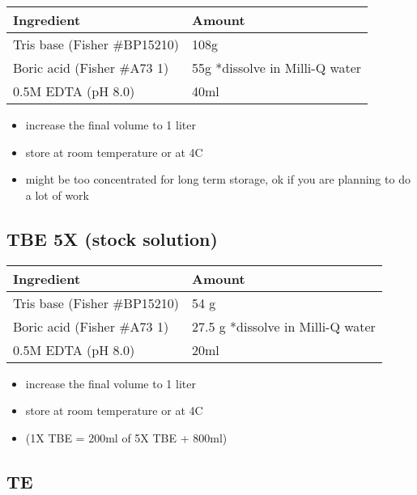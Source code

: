 \documentclass[
  letterpaper,
  DIV=11,
  numbers=noendperiod]{scrreprt}
\begin{document}
\begin{longtable}[]{@{}ll@{}}
\toprule()
\textbf{Ingredient} & \textbf{Amount} \\
\midrule()
\endhead
Tris base (Fisher \#BP15210) & 108g \\
Boric acid (Fisher \#A73 1) & 55g *dissolve in Milli-Q water \\
0.5M EDTA (pH 8.0) & 40ml \\
\bottomrule()
\end{longtable}

\begin{itemize}
\item
  increase the final volume to 1 liter
\item
  store at room temperature or at 4C
\item
  might be too concentrated for long term storage, ok if you are
  planning to do a lot of work
\end{itemize}

\hypertarget{tbe-5x-stock-solution}{%
\subsection*{\texorpdfstring{\textbf{TBE 5X (stock
solution)}}{TBE 5X (stock solution)}}\label{tbe-5x-stock-solution}}

\begin{longtable}[]{@{}ll@{}}
\toprule()
\textbf{Ingredient} & \textbf{Amount} \\
\midrule()
\endhead
Tris base (Fisher \#BP15210) & 54 g \\
Boric acid (Fisher \#A73 1) & 27.5 g *dissolve in Milli-Q water \\
0.5M EDTA (pH 8.0) & 20ml \\
\bottomrule()
\end{longtable}

\begin{itemize}
\item
  increase the final volume to 1 liter
\item
  store at room temperature or at 4C
\item
  (1X TBE = 200ml of 5X TBE + 800ml)
\end{itemize}

\hypertarget{te}{%
\subsection*{\texorpdfstring{\textbf{TE}}{TE}}\label{te}}
\end{document}
